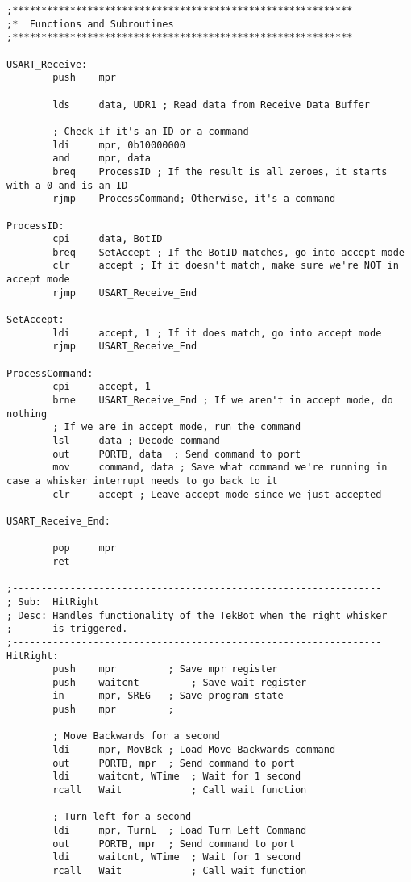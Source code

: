 \documentclass[12pt,letterpaper]{article}
\begin{document}
\begin{verbatim}
;***********************************************************
;*  Functions and Subroutines
;***********************************************************

USART_Receive:
        push    mpr

        lds     data, UDR1 ; Read data from Receive Data Buffer

        ; Check if it's an ID or a command
        ldi     mpr, 0b10000000
        and     mpr, data
        breq    ProcessID ; If the result is all zeroes, it starts with a 0 and is an ID
        rjmp    ProcessCommand; Otherwise, it's a command

ProcessID:
        cpi     data, BotID
        breq    SetAccept ; If the BotID matches, go into accept mode
        clr     accept ; If it doesn't match, make sure we're NOT in accept mode
        rjmp    USART_Receive_End

SetAccept:
        ldi     accept, 1 ; If it does match, go into accept mode
        rjmp    USART_Receive_End

ProcessCommand:
        cpi     accept, 1
        brne    USART_Receive_End ; If we aren't in accept mode, do nothing
        ; If we are in accept mode, run the command
        lsl     data ; Decode command
        out     PORTB, data  ; Send command to port
        mov     command, data ; Save what command we're running in case a whisker interrupt needs to go back to it
        clr     accept ; Leave accept mode since we just accepted

USART_Receive_End:

        pop     mpr
        ret

;----------------------------------------------------------------
; Sub:  HitRight
; Desc: Handles functionality of the TekBot when the right whisker
;       is triggered.
;----------------------------------------------------------------
HitRight:
        push    mpr         ; Save mpr register
        push    waitcnt         ; Save wait register
        in      mpr, SREG   ; Save program state
        push    mpr         ;

        ; Move Backwards for a second
        ldi     mpr, MovBck ; Load Move Backwards command
        out     PORTB, mpr  ; Send command to port
        ldi     waitcnt, WTime  ; Wait for 1 second
        rcall   Wait            ; Call wait function

        ; Turn left for a second
        ldi     mpr, TurnL  ; Load Turn Left Command
        out     PORTB, mpr  ; Send command to port
        ldi     waitcnt, WTime  ; Wait for 1 second
        rcall   Wait            ; Call wait function


\end{verbatim}
\end{document}

